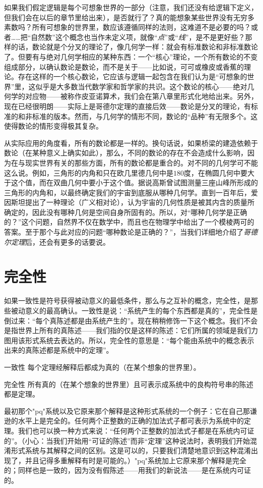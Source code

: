 如果我们假定逻辑是每个可想象世界的一部分（注意，我们还没有给逻辑下定义，但我们会在以后的章节里给出来），是否就行了？真的能想象某些世界没有无穷多素数吗？所有可想象的世界里，数应该遵循同样的法则，这难道不是必要的吗？或者……把“自然数”这个概念也当作未定义项，就像“\emph{点}”或“\emph{线}”，是不是更好些？那样的话，数论就是个分叉的理论了，像几何学一样：就会有标准数论和非标准数论了。但要有与绝对几何学相应的某种东西：一个“核心”理论，一个所有数论的不变组成部分，以确认数论是数论，而不是关于——比如说，可可或橡皮或香蕉的理论。存在这样的一个核心数论，它应该与逻辑一起包含在我们认为是“可想象的世界”里，这似乎是大多数当代数学家和哲学家的共识。这个数论的核心——绝对几何学的对应物——被称作皮亚诺算术，我们会在第八章里形式化地给出来。另外，现在已经很明朗——实际上是哥德尔定理的直接后效——数论是分叉的理论，有标准的和非标准的版本。然而，与几何学的情形不同，数论的“品种”有无限多个。这使得数论的情形变得极其复杂。

从实际应用的角度看，所有的数论都是一样的。换句话说，如果桥梁的建造依赖于数论（在某种意义上确实如此），那么，不同的数论的存在不会造成什么影响，因为在与现实世界有关的那些方面，所有的数论都是重合的。对不同的几何学可不能这么说。例如，三角形的内角和只在欧几里德几何中是$180$度，在椭圆几何中要大于这个值，而在双曲几何中要小于这个值。据说高斯曾试图测量三座山峰所形成的三角形的内角和，以最终确定我们的宇宙到底服从哪种几何学。直到一百年后，爱因斯坦提出了一种理论（广义相对论），认为宇宙的几何性质是被其内含的质量所确定的，因此没有哪种几何是空间自身所固有的。所以，对“哪种几何学是正确的？”这个问题，自然界不仅在数学中，而且也在物理学中给出了一个模棱两可的答案。至于那个与此对应的问题“哪种数论是正确的？”，当我们详细地介绍了\emph{哥德尔定理}后，还会有更多的话要说。

\section{完全性}

如果一致性是符号获得被动意义的最低条件，那么与之互补的概念，完全性，是那些被动意义的最高确认。一致性是说：“系统产生的每个东西都是真的”，完全性是倒过来：“每个真陈述都是由系统产生的”。现在稍稍修饰一下这个概念。我们不会是指世界上所有的真陈述——我们指的仅是这样的陈述：它们所属的领域是我们力图用该形式系统去表达的。所以，完全性的意思是：“每个能由系统中的概念表示出来的真陈述都是系统中的定理”。
\begin{thm}{一致性}
每个定理经解释后都成为真的（在某个想象的世界里）。
\end{thm}
\begin{thm}{完全性}
所有真的（在某个想象的世界里）且可表示成系统中的良构符号串的陈述都是定理。
\end{thm}
最初那个"pq"系统以及它原来那个解释是这种形式系统的一个例子：它在自己那谦逊的水平上是完全的。任何两个正整数的正确的加法式子都可表示为系统中的定理。我们也可以换一种方式来说：“任何两个正整数的加法式子都是在系统内可证的”。（小心：当我们开始用“可证的陈述”而非“定理”这种说法时，表明我们开始混淆形式系统与其解释之间的区别。这是可以的，只要我们清楚地意识到这种混淆出现了，并且记得多重解释有时是可能的。）"pq"系统加上它原来那个解释是完全的；同样也是一致的，因为没有假陈述——用我们的新说法——是在系统内可证的。

